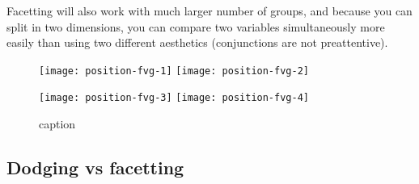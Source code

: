 Facetting will also work with much larger number of groups, and because you can split in two dimensions, you can compare two variables simultaneously more easily than using two different aesthetics (conjunctions are not preattentive).

\begin{figure}[htbp]
  \centering
    \texttt{[image: position-fvg-1]}%
    \texttt{[image: position-fvg-2]}

    \texttt{[image: position-fvg-3]}%
    \texttt{[image: position-fvg-4]}
  \caption{caption}
  \label{fig:facet-vs-groups}
\end{figure}


\subsection{Dodging vs facetting}
\label{sub:dodging_vs_facetting}



% 
% 
% 
% 
% 
% 


